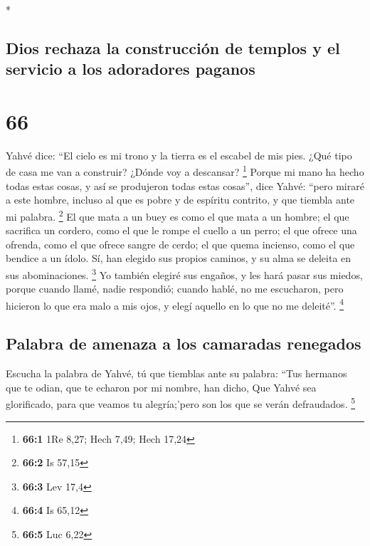\begin{paracol}{2}
\begin{otherlanguage}{english}
\end{otherlanguage}

\switchcolumn[0]*

\hypertarget{dios-rechaza-la-construcciuxf3n-de-templos-y-el-servicio-a-los-adoradores-paganos}{%
\subsection{Dios rechaza la construcción de templos y el servicio a los
adoradores
paganos}\label{dios-rechaza-la-construcciuxf3n-de-templos-y-el-servicio-a-los-adoradores-paganos}}

\hypertarget{section-130}{%
\section{66}\label{section-130}}

 Yahvé dice: ``El cielo es mi trono y la tierra es el
escabel de mis pies. ¿Qué tipo de casa me van a construir? ¿Dónde voy a
descansar? \footnote{\textbf{66:1} 1Re 8,27; Hech 7,49; Hech 17,24}
 Porque mi mano ha hecho todas estas cosas, y así se
produjeron todas estas cosas'', dice Yahvé: ``pero miraré a este hombre,
incluso al que es pobre y de espíritu contrito, y que tiembla ante mi
palabra. \footnote{\textbf{66:2} Is 57,15}  El que mata a
un buey es como el que mata a un hombre; el que sacrifica un cordero,
como el que le rompe el cuello a un perro; el que ofrece una ofrenda,
como el que ofrece sangre de cerdo; el que quema incienso, como el que
bendice a un ídolo. Sí, han elegido sus propios caminos, y su alma se
deleita en sus abominaciones. \footnote{\textbf{66:3} Lev 17,4}
 Yo también elegiré sus engaños, y les hará pasar sus
miedos, porque cuando llamé, nadie respondió; cuando hablé, no me
escucharon, pero hicieron lo que era malo a mis ojos, y elegí aquello en
lo que no me deleité''. \footnote{\textbf{66:4} Is 65,12}

\hypertarget{palabra-de-amenaza-a-los-camaradas-renegados}{%
\subsection{Palabra de amenaza a los camaradas
renegados}\label{palabra-de-amenaza-a-los-camaradas-renegados}}

 Escucha la palabra de Yahvé, tú que tiemblas ante su
palabra: ``Tus hermanos que te odian, que te echaron por mi nombre, han
dicho, Que Yahvé sea glorificado, para que veamos tu alegría;'pero son
los que se verán defraudados. \footnote{\textbf{66:5} Luc 6,22}


\end{paracol}
